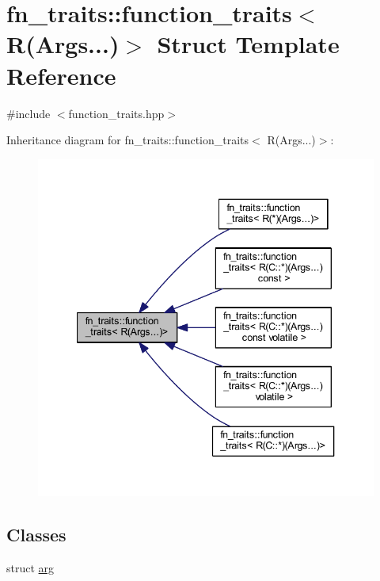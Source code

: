\hypertarget{structfn__traits_1_1function__traits_3_01_r_07_args_8_8_8_08_4}{}\section{fn\+\_\+traits\+:\+:function\+\_\+traits$<$ R(Args...)$>$ Struct Template Reference}
\label{structfn__traits_1_1function__traits_3_01_r_07_args_8_8_8_08_4}


{\ttfamily \#include $<$function\+\_\+traits.\+hpp$>$}



Inheritance diagram for fn\+\_\+traits\+:\+:function\+\_\+traits$<$ R(Args...)$>$\+:\nopagebreak
\begin{figure}[H]
\begin{center}
\leavevmode
\includegraphics[width=340pt]{d7/d7c/structfn__traits_1_1function__traits_3_01_r_07_args_8_8_8_08_4__inherit__graph}
\end{center}
\end{figure}
\subsection*{Classes}
\begin{DoxyCompactItemize}
\item 
struct \hyperlink{structfn__traits_1_1function__traits_3_01_r_07_args_8_8_8_08_4_d9/d01/structfn__traits_1_1function__traits_3_01_r_07_args_8_8_8_08_4_1_1arg}{arg}
\end{DoxyCompactItemize}
